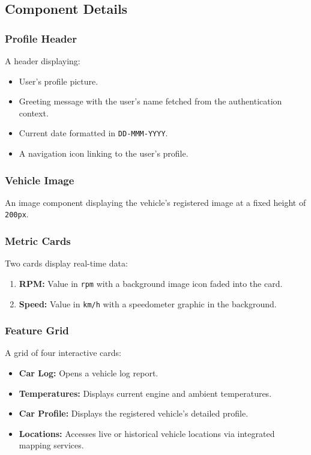     \subsection{Component Details}

    \subsubsection*{Profile Header}
    A header displaying:
    \begin{itemize}
        \item User’s profile picture.
        \item Greeting message with the user's name fetched from the authentication context.
        \item Current date formatted in \texttt{DD-MMM-YYYY}.
        \item A navigation icon linking to the user’s profile.
    \end{itemize}

    \subsubsection*{Vehicle Image}
    An image component displaying the vehicle's registered image at a fixed height of \texttt{200px}.

    \subsubsection*{Metric Cards}
    Two cards display real-time data:
    \begin{enumerate}
        \item \textbf{RPM:} Value in \texttt{rpm} with a background image icon faded into the card.
        \item \textbf{Speed:} Value in \texttt{km/h} with a speedometer graphic in the background.
    \end{enumerate}

    \subsubsection*{Feature Grid}
    A grid of four interactive cards:
    \begin{itemize}
        \item \textbf{Car Log:} Opens a vehicle log report.
        \item \textbf{Temperatures:} Displays current engine and ambient temperatures.
        \item \textbf{Car Profile:} Displays the registered vehicle's detailed profile.
        \item \textbf{Locations:} Accesses live or historical vehicle locations via integrated mapping services.
    \end{itemize}

